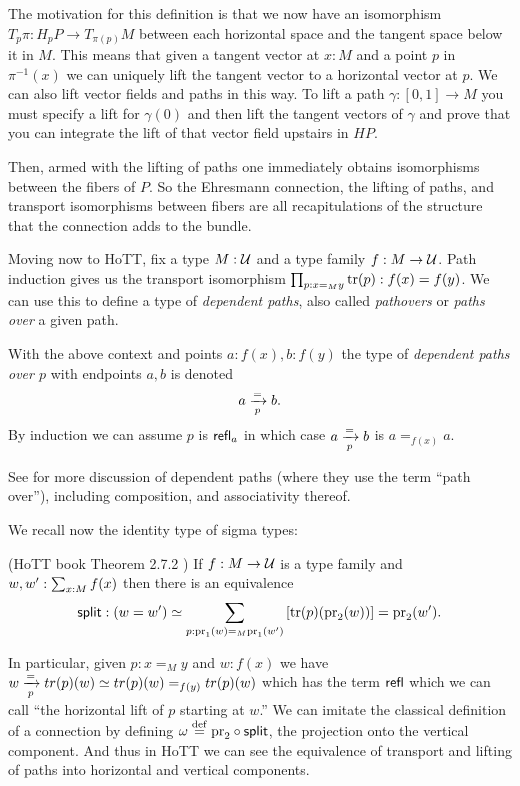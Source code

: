 \documentclass[12pt]{article}
\begin{document}
The motivation for this definition is that we now have an isomorphism \( T_p\pi:H_pP\to T_{\pi(p)}M \) between each horizontal space and the tangent space below it in \( M \). This means that given a tangent vector at \( x:M \) and a point \( p \) in \( \pi^{-1}(x) \) we can uniquely lift the tangent vector to a horizontal vector at \( p \). We can also lift vector fields and paths in this way. To lift a path \( \gamma:[0,1]\to M \) you must specify a lift for \( \gamma(0) \) and then lift the tangent vectors of \( \gamma \) and prove that you can integrate the lift of that vector field upstairs in \( HP \).

Then, armed with the lifting of paths one immediately obtains isomorphisms between the fibers of \( P \). So the Ehresmann connection, the lifting of paths, and transport isomorphisms between fibers are all recapitulations of the structure that the connection adds to the bundle.

Moving now to HoTT, fix a type \( M:\mathcal{U} \) and a type family \( f:M\to\mathcal{U} \). Path induction gives us the transport isomorphism \( \prod_{p:x=_M y}\mathrm{tr}(p):f(x)=f(y) \). We can use this to define a type of \emph{dependent paths}, also called \emph{pathovers} or \emph{paths over} a given path.

\begin{mydef}
With the above context and points \( a:f(x), b:f(y) \) the type of \emph{dependent paths over \( p \)} with endpoints \( a, b \) is denoted
\[ a\xrightarrow[{p}]{=}b.
\]
By induction we can assume \( p \) is \( \mathsf{refl}_a \) in which case \( a\xrightarrow[{p}]{=}b \) is \( a=_{f(x)}a \).
\end{mydef}

See \cite{Symmetry} for more discussion of dependent paths (where they use the term ``path over''), including composition, and associativity thereof.

We recall now the identity type of sigma types:

\begin{mythm}\label{thm:idsit}
(HoTT book Theorem 2.7.2 \cite{hottbook}) If \( f:M\to \mathcal{U} \) is a type family and \( w,w':\sum_{x:M}f(x) \) then there is an equivalence 
\[ 
\mathsf{split}:(w=w')\simeq \sum_{p:\mathrm{pr}_1(w)=_M\mathrm{pr}_1(w')} \left[\mathrm{tr}(p)(\mathrm{pr}_2(w))\right] = \mathrm{pr}_2(w').
\]
\end{mythm}

In particular, given \( p:x=_M y \) and \( w:f(x) \) we have \( w\xrightarrow[{p}]{=}tr(p)(w)\simeq tr(p)(w)=_{f(y)}tr(p)(w) \) which has the term \( \mathsf{refl} \) which we can call ``the horizontal lift of \( p \) starting at \( w \).'' We can imitate the classical definition of a connection by defining \( \omega\stackrel{\mathrm{def}}{=} \mathrm{pr}_2\circ\mathsf{split} \), the projection onto the vertical component. And thus in HoTT we can see the equivalence of transport and lifting of paths into horizontal and vertical components.
\end{document}
